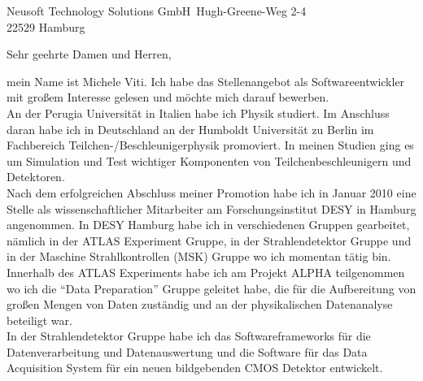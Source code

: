 \documentclass[ebner,paper=a4,fontsize=11pt,ngerman,BCOR=10mm]{scrlttr2}%
\begin{document}
\pagestyle{empty}

\begin{letter}{Neusoft Technology Solutions GmbH\
Hugh-Greene-Weg 2-4\\
22529 Hamburg}


\setlength{\parindent}{15pt}

\opening{Sehr geehrte Damen und Herren,} 

mein Name ist Michele Viti. Ich habe das Stellenangebot als Softwareentwickler
mit gro{\ss}em Interesse gelesen und m{\"o}chte mich darauf bewerben. \\
% 
% 
% 
\indent An der Perugia Universit\"at in Italien habe ich Physik studiert. Im
Anschluss daran habe ich in Deutschland an der Humboldt Universit\"at
zu Berlin im Fachbereich Teilchen-/Beschleunigerphysik promoviert. In
meinen Studien ging es um Simulation und Test wichtiger
Komponenten von Teilchenbeschleunigern und Detektoren.\\
\indent Nach dem erfolgreichen Abschluss meiner Promotion habe ich in Januar
2010 eine Stelle als wissenschaftlicher Mitarbeiter am Forschungsinstitut DESY
in Hamburg angenommen. In DESY Hamburg habe ich in verschiedenen Gruppen
gearbeitet, n{\"a}mlich in der ATLAS Experiment Gruppe, in der Strahlendetektor
Gruppe und in der Maschine Strahlkontrollen (MSK) Gruppe wo ich momentan
t{\"a}tig bin. \\
Innerhalb des ATLAS Experiments habe ich am Projekt ALPHA teilgenommen wo
ich die "`Data Preparation"' Gruppe geleitet habe, die f{\"u}r die Aufbereitung
von gro{\ss}en Mengen von Daten zust{\"a}ndig und an der physikalischen
Datenanalyse beteiligt war.\\
In der Strahlendetektor Gruppe habe ich das Softwareframeworks f\"ur die
Datenverarbeitung und Datenauswertung und die Software f{\"u}r das Data
Acquisition System f\"ur ein neuen bildgebenden CMOS Detektor entwickelt.\\

\end{letter}
\end{document}

